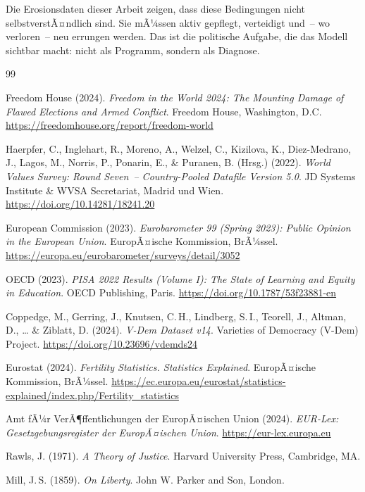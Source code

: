 ﻿\documentclass[a4paper,12pt]{article}
\theoremstyle{definition}
\begin{document}
Die Erosionsdaten dieser Arbeit zeigen, dass diese Bedingungen nicht selbstverstÃ¤ndlich sind. Sie mÃ¼ssen aktiv gepflegt, verteidigt und~-- wo verloren~-- neu errungen werden. Das ist die politische Aufgabe, die das Modell sichtbar macht: nicht als Programm, sondern als Diagnose.

\begin{thebibliography}{99}

Freedom House (2024).
\textit{Freedom in the World 2024: The Mounting Damage of Flawed Elections and Armed Conflict}.
Freedom House, Washington, D.C.
\url{https://freedomhouse.org/report/freedom-world}

Haerpfer, C., Inglehart, R., Moreno, A., Welzel, C., Kizilova, K., Diez-Medrano, J., Lagos, M., Norris, P., Ponarin, E., \& Puranen, B. (Hrsg.) (2022).
\textit{World Values Survey: Round Seven~-- Country-Pooled Datafile Version 5.0}.
JD Systems Institute \& WVSA Secretariat, Madrid und Wien.
\url{https://doi.org/10.14281/18241.20}

European Commission (2023).
\textit{Eurobarometer 99 (Spring 2023): Public Opinion in the European Union}.
EuropÃ¤ische Kommission, BrÃ¼ssel.
\url{https://europa.eu/eurobarometer/surveys/detail/3052}

OECD (2023).
\textit{PISA 2022 Results (Volume I): The State of Learning and Equity in Education}.
OECD Publishing, Paris.
\url{https://doi.org/10.1787/53f23881-en}

Coppedge, M., Gerring, J., Knutsen, C.\,H., Lindberg, S.\,I., Teorell, J.,
Altman, D., \ldots{} \& Ziblatt, D. (2024).
\textit{V-Dem Dataset v14}.
Varieties of Democracy (V-Dem) Project.
\url{https://doi.org/10.23696/vdemds24}

Eurostat (2024).
\textit{Fertility Statistics. Statistics Explained}.
EuropÃ¤ische Kommission, BrÃ¼ssel.
\url{https://ec.europa.eu/eurostat/statistics-explained/index.php/Fertility_statistics}

Amt fÃ¼r VerÃ¶ffentlichungen der EuropÃ¤ischen Union (2024).
\textit{EUR-Lex: Gesetzgebungsregister der EuropÃ¤ischen Union}.
\url{https://eur-lex.europa.eu}

Rawls, J. (1971).
\textit{A Theory of Justice}.
Harvard University Press, Cambridge, MA.

Mill, J.\,S. (1859).
\textit{On Liberty}.
John W. Parker and Son, London.


\end{thebibliography}
\end{document}
